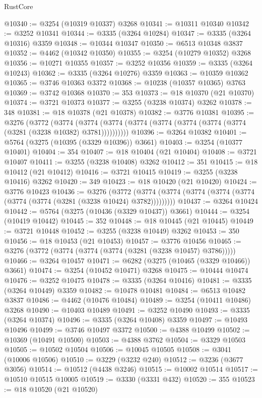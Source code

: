 \begin{lexlean}{RustCore}
\begin{coremodule}
@10340 := @3254 (@10319 @10337) @3268
@10341 := @10311 @10340
@10342 := @3252 @10341
@10344 := @3335 (@3264 @10284)
@10347 := @3335 (@3264 @10316) @3359
@10348 := @10344 @10347
@10350 := @6513 @10348 @3837
@10352 := @4462 (@10342 @10350)
@10355 := @3254 (@10279 @10352) @3268
@10356 := @10271 @10355
@10357 := @3252 @10356
@10359 := @3335 (@3264 @10243)
@10362 := @3335 (@3264 @10276) @3359
@10363 := @10359 @10362
@10365 := @3746 @10363 @3372
@10368 := @10238 (@10357 @10365) @3763
@10369 := @3742 @10368
@10370 := 353
@10373 := @18 @10370 (@21 @10370)
@10374 := @3721 @10373
@10377 := @3255 (@3238 @10374) @3262
@10378 := 348
@10381 := @18 @10378 (@21 @10378)
@10382 := @3776 @10381
@10395 := @3276
    (@3772
      (@3774 (@3774 (@3774 (@3774 (@3774 (@3774 (@3774 (@3774 (@3281 (@3238 @10382) @3781))))))))))
@10396 := @3264 @10382
@10401 := @5764 (@3275 (@10395 (@3329 @10396)) @3661)
@10403 := @3254 (@10377 @10401)
@10404 := 354
@10407 := @18 @10404 (@21 @10404)
@10408 := @3721 @10407
@10411 := @3255 (@3238 @10408) @3262
@10412 := 351
@10415 := @18 @10412 (@21 @10412)
@10416 := @3721 @10415
@10419 := @3255 (@3238 @10416) @3262
@10420 := 349
@10423 := @18 @10420 (@21 @10420)
@10424 := @3776 @10423
@10436 := @3276
    (@3772 (@3774 (@3774 (@3774 (@3774 (@3774 (@3774 (@3774 (@3281 (@3238 @10424) @3782)))))))))
@10437 := @3264 @10424
@10442 := @5764 (@3275 (@10436 (@3329 @10437)) @3661)
@10444 := @3254 (@10419 @10442)
@10445 := 352
@10448 := @18 @10445 (@21 @10445)
@10449 := @3721 @10448
@10452 := @3255 (@3238 @10449) @3262
@10453 := 350
@10456 := @18 @10453 (@21 @10453)
@10457 := @3776 @10456
@10465 := @3276 (@3772 (@3774 (@3774 (@3774 (@3281 (@3238 @10457) @3786)))))
@10466 := @3264 @10457
@10471 := @6282 (@3275 (@10465 (@3329 @10466)) @3661)
@10474 := @3254 (@10452 @10471) @3268
@10475 := @10444 @10474
@10476 := @3252 @10475
@10478 := @3335 (@3264 @10416)
@10481 := @3335 (@3264 @10449) @3359
@10482 := @10478 @10481
@10484 := @6513 @10482 @3837
@10486 := @4462 (@10476 @10484)
@10489 := @3254 (@10411 @10486) @3268
@10490 := @10403 @10489
@10491 := @3252 @10490
@10493 := @3335 (@3264 @10374)
@10496 := @3335 (@3264 @10408) @3359
@10497 := @10493 @10496
@10499 := @3746 @10497 @3372
@10500 := @4388 @10499
@10502 := @10369 (@10491 @10500)
@10503 := @4388 @3762
@10504 := @3329 @10503
@10505 := @10502 @10504
@10506 := @10045 @10505
@10508 := @3041 (@10006 @10506)
@10510 := @3229 (@3232 @240)
@10512 := @3236 (@3677 @3056)
@10514 := @10512 (@4438 @3246)
@10515 := @10002 @10514
@10517 := @10510 @10515 @10005
@10519 := @3330 (@3331 @432)
@10520 := 355
@10523 := @18 @10520 (@21 @10520)

\end{coremodule}
\end{lexlean}

